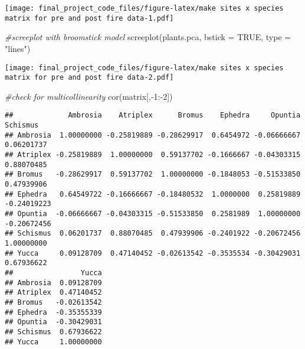 \documentclass[
]{article}
\newenvironment{Shaded}{\begin{snugshade}}{\end{snugshade}}
\newcommand{\AttributeTok}[1]{\textcolor[rgb]{0.77,0.63,0.00}{#1}}
\newcommand{\CommentTok}[1]{\textcolor[rgb]{0.56,0.35,0.01}{\textit{#1}}}
\newcommand{\ConstantTok}[1]{\textcolor[rgb]{0.00,0.00,0.00}{#1}}
\newcommand{\DecValTok}[1]{\textcolor[rgb]{0.00,0.00,0.81}{#1}}
\newcommand{\FunctionTok}[1]{\textcolor[rgb]{0.00,0.00,0.00}{#1}}
\newcommand{\NormalTok}[1]{#1}
\newcommand{\SpecialCharTok}[1]{\textcolor[rgb]{0.00,0.00,0.00}{#1}}
\newcommand{\StringTok}[1]{\textcolor[rgb]{0.31,0.60,0.02}{#1}}
\begin{document}
\texttt{[image: final\_project\_code\_files/figure-latex/make sites x species matrix for pre and post fire data-1.pdf]}

\begin{Shaded}
\begin{Highlighting}[]
\CommentTok{\#screeplot with broomstick model }
\FunctionTok{screeplot}\NormalTok{(plants.pca, }\AttributeTok{bstick =} \ConstantTok{TRUE}\NormalTok{, }\AttributeTok{type =} \StringTok{"lines"}\NormalTok{)}
\end{Highlighting}
\end{Shaded}

\texttt{[image: final\_project\_code\_files/figure-latex/make sites x species matrix for pre and post fire data-2.pdf]}

\begin{Shaded}
\begin{Highlighting}[]
\CommentTok{\#check for multicollinearity}
\FunctionTok{cor}\NormalTok{(matrix[,}\SpecialCharTok{{-}}\DecValTok{1}\SpecialCharTok{:{-}}\DecValTok{2}\NormalTok{])}
\end{Highlighting}
\end{Shaded}

\begin{verbatim}
##             Ambrosia    Atriplex      Bromus    Ephedra     Opuntia    Schismus
## Ambrosia  1.00000000 -0.25819889 -0.28629917  0.6454972 -0.06666667  0.06201737
## Atriplex -0.25819889  1.00000000  0.59137702 -0.1666667 -0.04303315  0.88070485
## Bromus   -0.28629917  0.59137702  1.00000000 -0.1848053 -0.51533850  0.47939906
## Ephedra   0.64549722 -0.16666667 -0.18480532  1.0000000  0.25819889 -0.24019223
## Opuntia  -0.06666667 -0.04303315 -0.51533850  0.2581989  1.00000000 -0.20672456
## Schismus  0.06201737  0.88070485  0.47939906 -0.2401922 -0.20672456  1.00000000
## Yucca     0.09128709  0.47140452 -0.02613542 -0.3535534 -0.30429031  0.67936622
##                Yucca
## Ambrosia  0.09128709
## Atriplex  0.47140452
## Bromus   -0.02613542
## Ephedra  -0.35355339
## Opuntia  -0.30429031
## Schismus  0.67936622
## Yucca     1.00000000
\end{verbatim}
\end{document}
